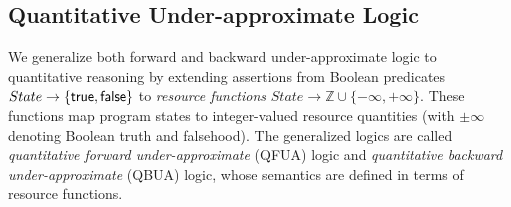 
\subsection{Quantitative Under-approximate Logic}
\label{sec:technical:qual}

We generalize both forward and backward under-approximate logic to quantitative reasoning by extending assertions from Boolean predicates $State \to \{\mathsf{true}, \mathsf{false}\}$ to \emph{resource functions} $State \to \mathbb{Z} \cup \{-\infty, +\infty\}$. These functions map program states to integer-valued resource quantities (with $\pm\infty$ denoting Boolean truth and falsehood). The generalized logics are called \emph{quantitative forward under-approximate} (QFUA) logic and \emph{quantitative backward under-approximate} (QBUA) logic, whose semantics are defined in terms of resource functions.

